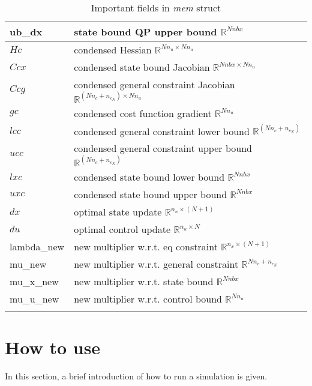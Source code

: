\documentclass{article}
\newcommand{\alert}[1]{{\textit{#1}}}
\begin{document}
\begin{longtable}{l|l}
		ub\_dx & state bound QP upper bound     $\mathbb{R}^{Nnbx}$           \\\hline
		$Hc$ & condensed Hessian    $\mathbb{R}^{Nn_u\times Nn_u}$                     \\
		$Ccx$ & condensed state bound Jacobian  $\mathbb{R}^{Nnbx\times Nn_u}$          \\
		$Ccg$ & condensed general constraint Jacobian  $\mathbb{R}^{(Nn_c+n_{c_N})\times Nn_u}$    \\
		$gc$ & condensed cost function gradient  $\mathbb{R}^{Nn_u}$        \\
		$lcc$ & condensed general constraint lower bound $\mathbb{R}^{(Nn_c+n_{c_N})}$ \\
		$ucc$ & condensed general constraint upper bound $\mathbb{R}^{(Nn_c+n_{c_N})}$ \\
		$lxc$ & condensed state bound lower bound   $\mathbb{R}^{Nnbx}$      \\
		$uxc$ & condensed state bound upper bound   $\mathbb{R}^{Nnbx}$      \\\hline
		$dx$ & optimal state update     $\mathbb{R}^{n_x\times (N+1)}$                 \\
		$du$ & optimal control update   $\mathbb{R}^{n_u\times N}$                 \\
		lambda\_new & new multiplier w.r.t. eq constraint $\mathbb{R}^{n_x\times (N+1)}$      \\
		mu\_new & new multiplier w.r.t. general constraint  $\mathbb{R}^{Nn_c+n_{c_N}}$ \\
		mu\_x\_new & new multiplier w.r.t. state bound  $\mathbb{R}^{Nnbx}$       \\
		mu\_u\_new & new multiplier w.r.t. control bound  $\mathbb{R}^{Nn_u}$     \\
		\hline
	\caption{Important fields in \alert{mem} struct}
	\label{table:mem}
\end{longtable}

\section{How to use}
In this section, a brief introduction of how to run a simulation is given.
\end{document}
